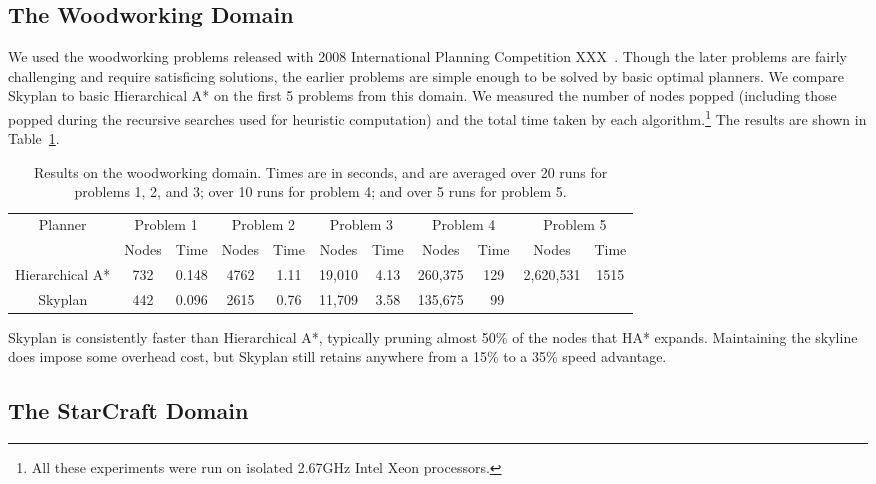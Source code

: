 \documentclass[letterpaper]{article}
\theoremstyle{plain} \newtheorem{theorem}{Theorem} \newtheorem{proposition}{Proposition} \newtheorem{lemma}{Lemma}
\theoremstyle{definition} \newtheorem{definition}{Definition} \newtheorem{conjecture}{Conjecture} \newtheorem*{example}{Example}
\theoremstyle{remark} \newtheorem*{remark}{Remark} \newtheorem*{note}{Note} \newtheorem{case}{Case}
\begin{document}
\subsection{The Woodworking Domain}

We used the woodworking problems released with 2008 International Planning Competition XXX~\cite{IPC2008}.
Though the later problems are fairly challenging and require satisficing solutions,
the earlier problems are simple enough to be solved by basic optimal planners. We compare
Skyplan to basic Hierarchical A* on the first 5 problems from this domain. We measured
the number of nodes popped (including those popped during the recursive searches used
for heuristic computation) and the total time taken by each algorithm.\footnote{All
these experiments were run on isolated 2.67GHz Intel Xeon processors.} The results are
shown in Table~\ref{tab:woodworking}.

\begin{table}
	\begin{center}
		\begin{tabular}{|c|cc|cc|cc|cc|cc|}
		\hline
		\multirow{2}{*}{Planner} & \multicolumn{2}{c|}{Problem 1}  & \multicolumn{2}{c|}{Problem 2} & \multicolumn{2}{c|}{Problem 3} & \multicolumn{2}{c|}{Problem 4} & \multicolumn{2}{c|}{Problem 5} \\
		& Nodes & Time & Nodes & Time & Nodes & Time & Nodes & Time & Nodes & Time \\
		\hline
		Hierarchical A* & 732 & 0.148 & 4762 & 1.11 & 19,010 & 4.13 & 260,375 & 129 & 2,620,531 & 1515 \\
		Skyplan         & 442 & 0.096 & 2615 & 0.76 & 11,709 & 3.58 & 135,675 & ~99 & & \\
		\hline
		\end{tabular}
	\end{center}
	\label{tab:woodworking}
	\caption{Results on the woodworking domain. Times are in seconds, and are averaged over 20 runs for problems 1, 2, and 3; over 10 runs for problem 4; and over 5 runs for problem 5.}
\end{table}

Skyplan is consistently faster than Hierarchical A*, typically pruning almost 50\% of the
nodes that HA* expands. Maintaining the skyline does impose some overhead cost, but Skyplan
still retains anywhere from a 15\% to a 35\% speed advantage.

\subsection{The StarCraft Domain}
\end{document}
